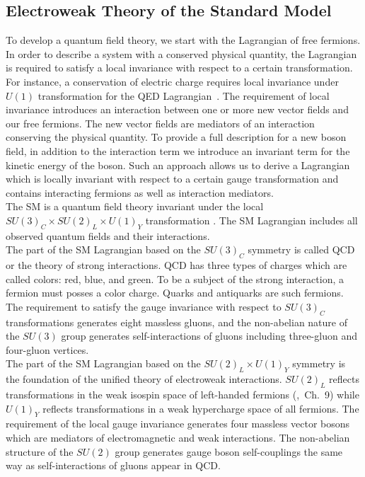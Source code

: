 \subsection{Electroweak Theory of the Standard Model}
\label{sec:WgAbout_SMEWK}

To develop a quantum field theory, we start with the Lagrangian of free fermions. In order to describe a system with a conserved physical quantity, the Lagrangian is required to satisfy a local invariance with respect to a certain transformation. For instance, a conservation of electric charge requires local invariance under $U(1)$ transformation for the QED Lagrangian~\cite{ref_Pich}. The requirement of local invariance introduces an interaction between one or more new vector fields and our free fermions. The new vector fields are mediators of an interaction conserving the physical quantity. To provide a full description for a new boson field, in addition to the interaction term we introduce an invariant term for the kinetic energy of the boson. Such an approach allows us to derive a Lagrangian which is locally invariant with respect to a certain gauge transformation and contains interacting fermions as well as interaction mediators. \\ 

The SM is a quantum field theory invariant under the local $SU(3)_C \times SU(2)_L \times U(1)_Y$ transformation \cite{ref_Pich}. The SM Lagrangian includes all observed quantum fields and their interactions. \\ 

The part of the SM Lagrangian based on the $SU(3)_C$ symmetry is called QCD or the theory of strong interactions. QCD has three types of charges which are called colors: red, blue, and green. To be a subject of the strong interaction, a fermion must posses a color charge. Quarks and antiquarks are such fermions. The requirement to satisfy the gauge invariance with respect to $SU(3)_C$ transformations generates eight massless gluons, and the non-abelian nature of the $SU(3)$ group generates self-interactions of gluons including three-gluon and four-gluon vertices.\\

The part of the SM Lagrangian based on the $SU(2)_L \times U(1)_Y$ symmetry is the foundation of the unified theory of electroweak interactions. $SU(2)_L$ reflects transformations in the weak isospin space of left-handed fermions (\cite{ref_Griffiths},~Ch.~9) while $U(1)_Y$ reflects transformations in a weak hypercharge space of all fermions. The requirement of the local gauge invariance generates four massless vector bosons which are mediators of electromagnetic and weak interactions. The non-abelian structure of the $SU(2)$ group generates gauge boson self-couplings the same way as self-interactions of gluons appear in QCD.\\ 

